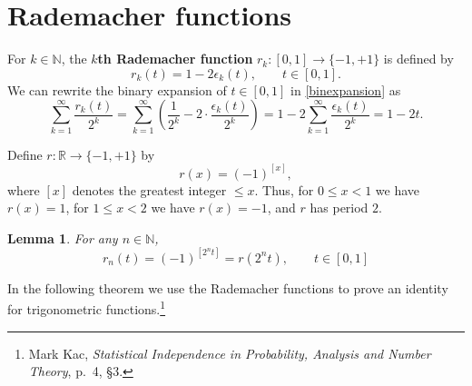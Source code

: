 \documentclass{article}
\newtheorem{lemma}[theorem]{Lemma}
\theoremstyle{definition}
\begin{document}
\section{Rademacher functions}
For $k \in \mathbb{N}$, the \textbf{$k$th Rademacher function} $r_k:[0,1] \to \{-1,+1\}$ is defined by
\[
r_k(t) = 1-2\epsilon_k(t), \qquad t \in [0,1].
\]
We can rewrite the binary expansion of $t \in [0,1]$ in \eqref{binexpansion} as
\begin{equation}
\sum_{k=1}^\infty \frac{r_k(t)}{2^k} = \sum_{k=1}^\infty \left(\frac{1}{2^k} - 2\cdot \frac{\epsilon_k(t)}{2^k} \right)
=1-2\sum_{k=1}^\infty \frac{\epsilon_k(t)}{2^k}=1-2t.
\label{binary}
\end{equation}


Define $r:\mathbb{R} \to \{-1,+1\}$ by 
\[
r(x) = (-1)^{[x]},
\]
where $[x]$ denotes the greatest integer $\leq x$. Thus, for $0 \leq x <1$ we have $r(x)=1$, for $1 \leq x < 2$ we have
$r(x)=-1$, and $r$ has period $2$. 

\begin{lemma}
For any $n \in \mathbb{N}$,
\[
r_n(t) =(-1)^{[2^nt]}= r(2^n t), \qquad t \in [0,1]
\]
\label{rformula}
\end{lemma}



In the following theorem we use the Rademacher functions to prove an identity for trigonometric functions.\footnote{Mark Kac, {\em Statistical Independence in Probability, Analysis and Number Theory}, p.~4, \S 3.}
\end{document}
